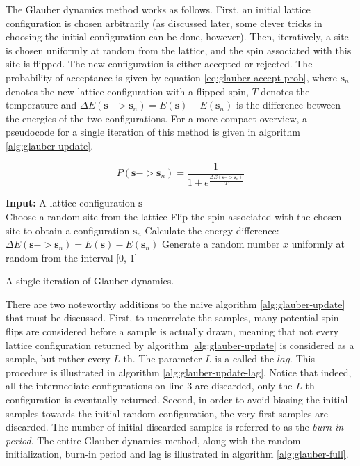 \documentclass[12pt]{article}
\begin{document}
The Glauber dynamics method works as follows. First, an initial lattice configuration is chosen arbitrarily (as discussed later, some clever tricks in choosing the initial configuration can be done, however). Then, iteratively, a site is chosen uniformly at random from the lattice, and the spin associated with this site is flipped. The new configuration is either accepted or rejected. The probability of acceptance is given by equation \ref{eq:glauber-accept-prob}, where $\boldsymbol{s}_n$ denotes the new lattice configuration with a flipped spin, $T$ denotes the temperature and $\Delta E(\boldsymbol{s} -> \boldsymbol{s}_n) = E(\boldsymbol{s}) - E(\boldsymbol{s}_{n})$ is the difference between the energies of the two configurations. For a more compact overview, a pseudocode for a single iteration of this method is given in algorithm \ref{alg:glauber-update}.

\begin{equation}
P(\boldsymbol{s} -> \boldsymbol{s}_{n}) = \frac{1}{1 + e^\frac{\Delta E(\boldsymbol{s} -> \boldsymbol{s}_n)}{T}}
\label{eq:glauber-accept-prob}
\end{equation}

\begin{algorithm}
\textbf{Input:} A lattice configuration $\boldsymbol{s}$ \\
Choose a random site from the lattice\;
Flip the spin associated with the chosen site to obtain a configuration $\boldsymbol{s}_n$\;
Calculate the energy difference: $\Delta E(\boldsymbol{s} -> \boldsymbol{s}_n) = E(\boldsymbol{s}) - E(\boldsymbol{s}_{n})$\;
Generate a random number $x$ uniformly at random from the interval [0, 1]\;
\label{alg:glauber-update}
\caption{A single iteration of Glauber dynamics.}
\end{algorithm}

There are two noteworthy additions to the naive algorithm \ref{alg:glauber-update} that must be discussed. First, to uncorrelate the samples, many potential spin flips are considered before a sample is actually drawn, meaning that not every lattice configuration returned by algorithm \ref{alg:glauber-update} is considered as a sample, but rather every $L$-th. The parameter $L$ is a called the $lag$. This procedure is illustrated in algorithm \ref{alg:glauber-update-lag}. Notice that indeed, all the intermediate configurations on line $3$ are discarded,  only the $L$-th configuration is eventually returned. Second, in order to avoid biasing the initial samples towards the initial random configuration, the very first samples are discarded. The number of initial discarded samples is referred to as the \textit{burn in period}. The entire Glauber dynamics method, along with the random initialization, burn-in period and lag is illustrated in algorithm \ref{alg:glauber-full}.
\end{document}
